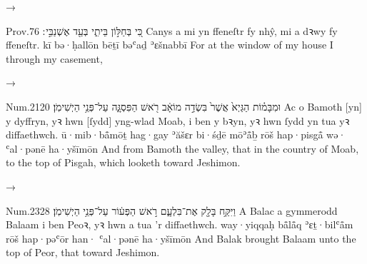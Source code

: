 \begin{frame}{\ex {} → }
	\begin{example}{Prov.}{7}{6}{}{}
		\quoling
		{כִּ֭י בְּחַלּ֣וֹן בֵּיתִ֑י בְּעַ֖ד אֶשְׁנַבִּ֣י ׃}
		{Canys a mi yn ffeneſtr fy nhŷ, mi a  dꝛwy fy ffeneſtr.}
		{kī bə·ḥallōn bēṯī bəʿaḏ ʾɛšnabbī }
		{For at the window of my house I  through my casement,}
	\end{example}
\end{frame}


\begin{frame}{\ex {} → }
	\begin{example}{Num.}{21}{20}{}{}
		\quoling
		{וּמִבָּמ֗וֹת הַגַּיְא֙ אֲשֶׁר֙ בִּשְׂדֵ֣ה מוֹאָ֔ב רֹ֖אשׁ הַפִּסְגָּ֑ה  עַל־פְּנֵ֥י הַיְשִׁימֹֽן׃}
		{Ac o Bamoth [yn] y dyffryn, yꝛ hwn [ſydd] yng-wlad Moab, i ben y bꝛyn, yꝛ hwn ſydd yn  tua yꝛ diffaethwch.}
		{ū·mib·bå̄mōṯ hag·gay ʾăšɛr bi·śḏē mōʾå̄ḇ rōš hap·pisgå̄ wə· ʿal·pənē ha·yšīmōn}
		{And from Bamoth  the valley, that  in the country of Moab, to the top of Pisgah, which looketh toward Jeshimon.}
	\end{example}
\end{frame}


\begin{frame}{\ex {} → }
	\begin{example}{Num.}{23}{28}{}{}
		\quoling
		{וַיִּקַּ֥ח בָּלָ֖ק אֶת־בִּלְעָ֑ם רֹ֣אשׁ הַפְּע֔וֹר  עַל־פְּנֵ֥י הַיְשִׁימֹֽן׃}
		{A Balac a gymmerodd Balaam i ben Peoꝛ, yꝛ hwn a  tua ’r diffaethwch.}
		{way·yiqqaḥ bå̄lå̄q ʾɛṯ·bilʿå̄m rōš hap·pəʿōr han· ʿal·pənē ha·yšīmōn}
		{And Balak brought Balaam unto the top of Peor, that  toward Jeshimon.}
	\end{example}
\end{frame}






